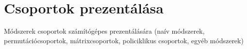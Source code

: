 \section{Csoportok prezentálása}
\label{sec:csoport}
Módszerek csoportok számítógépes prezentálására
(naív módszerek, permutációcsoportok, mátrixcsoportok, policiklikus csoportok, egyéb módszerek)


\clearpage